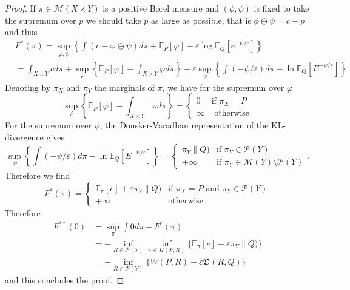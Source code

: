 \documentclass{amsart}
\theoremstyle{definition}
\theoremstyle{remark}
\numberwithin{equation}{section}
\begin{document}
\begin{proof}
If $\pi\in \mathcal{M}(X \times Y)$ is a positive Borel measure and $(\phi,\psi)$ is fixed to take the supremum over $p$  we should take $p$ 
as large as possible, that is $\phi \oplus \psi = c-p$ and thus 
\begin{equation}
\begin{aligned}
&F^*(\pi) = \sup_{\varphi, \psi} 
\left\{ 
\int (c - \varphi \oplus \psi) d\pi   + \mathbb{E}_P[\varphi] -\varepsilon\log \mathbb{E}_Q[e^{-\psi/\varepsilon}]
\right\}
\\
& = \int_{X \times Y} c  d\pi  + \sup_{\varphi} \left\{ \mathbb{E}_P[\varphi] - \int_{X \times Y} \varphi d\pi\right\} 
+ \varepsilon \sup_{\psi} \left\{ \int (-\psi/\varepsilon) d\pi 
- \ln \mathbb{E}_Q[ E^{-\psi/\varepsilon} ]
\right\} 
\end{aligned}
\end{equation}
Denoting by $\pi_X$ and $\pi_Y$ the marginals of $\pi$, we have for the supremum over $\varphi$
\begin{equation}
\sup_{\varphi} \left\{ \mathbb{E}_P[\varphi] - \int_{X \times Y} \varphi d\pi\right\}=\left\{
\begin{array}{cl} 0 & \textrm{if } \pi_X= P \\
\infty & \textrm{ otherwise} \end{array} 
\right.
\end{equation}
For the supremum over $\psi$, the Donsker-Varadhan representation of the KL-divergence gives
\begin{equation}
\sup_{\psi} \left\{ \int (-\psi/\varepsilon) d\pi 
- \ln \mathbb{E}_Q[ E^{-\psi/\varepsilon} ] \right\}= \left\{ 
\begin{array}{cl}  \mathfrak{}\pi_Y\|Q) & \textrm{if }\pi_Y \in \mathcal{P}(Y) \\
+ \infty & \textrm{if }  \pi_Y \in \mathcal{M}(Y) \setminus \mathcal{P}(Y) 
\end{array}
\right. .
\end{equation}
Therefore we find 
\begin{equation}
F^*(\pi) =  \left\{
\begin{array}{cl}
\mathbb{E}_{\pi}[c] + \varepsilon \mathfrak{} \pi_Y \|Q)  & \textrm{if } \pi_X =P \textrm{ and } \pi_Y \in \mathcal{P}(Y) \\
+\infty & \textrm{otherwise}
\end{array}
\right.
\end{equation}
Therefore 
\begin{equation}
\begin{aligned}
F^{**}(0) & =\sup_{\pi} \int 0 d\pi - F^*(\pi) \\
& =-  \inf_{R \in \mathcal{P}(Y)} \inf_{\pi \in \Pi(P,R)} \{ \mathbb{E}_{\pi}[c] + \varepsilon \mathfrak{} \pi_Y \|Q) \} \\
&= - \inf_{R \in \mathcal{P}(Y)}\{ W(P,R) + \varepsilon \mathfrak{D}(R, Q)\}
\end{aligned}
\end{equation}
and this concludes the proof. 
\end{proof}
\end{document}
